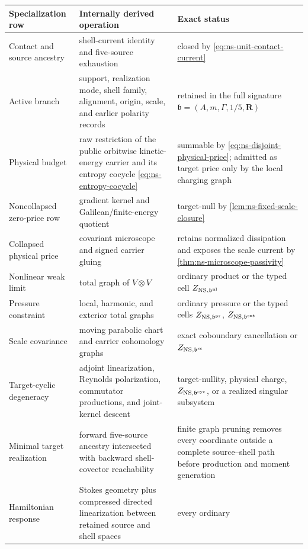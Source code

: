 \documentclass[11pt]{article}
\numberwithin{section}{part}
\theoremstyle{plain}
\theoremstyle{definition}
\theoremstyle{remark}
\begin{document}
\begin{center}
\small
\begin{tabular}{p{.27\linewidth}p{.30\linewidth}p{.34\linewidth}}
\toprule
Specialization row & Internally derived operation & Exact status\\
\midrule
Contact and source ancestry & shell-current identity and five-source
exhaustion & closed by \eqref{eq:ns-unit-contact-current}\\
Active branch & support, realization mode, shell family, alignment, origin,
scale, and earlier polarity records & retained in the full signature
\(\mathfrak b=(A,m,\Gamma,1/5,\mathbf R)\)\\
Physical budget & raw restriction of the public orbitwise kinetic-energy
carrier and its entropy cocycle \eqref{eq:ns-entropy-cocycle} & summable by \eqref{eq:ns-disjoint-physical-price}; admitted as
target price only by the local charging graph\\
Noncollapsed zero-price row & gradient kernel and Galilean/finite-energy
quotient & target-null by \cref{lem:ns-fixed-scale-closure}\\
Collapsed physical price & covariant microscope and signed carrier gluing &
retains normalized dissipation and exposes the scale current by
\cref{thm:ns-microscope-passivity}\\
Nonlinear weak limit & total graph of \(V\otimes V\) & ordinary product or
the typed cell \(Z_{{\rm NS},\mathfrak b^{\rm nl}}\)\\
Pressure constraint & local, harmonic, and exterior total graphs & ordinary
pressure or the typed cells
\(Z_{{\rm NS},\mathfrak b^{\rm pr}}\),
\(Z_{{\rm NS},\mathfrak b^{\rm ext}}\)\\
Scale covariance & moving parabolic chart and carrier cohomology graphs &
exact coboundary cancellation or
\(Z_{{\rm NS},\mathfrak b^{\rm sc}}\)\\
Target-cyclic degeneracy & adjoint linearization, Reynolds polarization,
commutator productions, and joint-kernel descent & target-nullity, physical
charge, \(Z_{{\rm NS},\mathfrak b^{\rm cyc}}\), or a realized singular
subsystem\\
Minimal target realization & forward five-source ancestry intersected with
backward shell-covector reachability & finite graph pruning removes every
coordinate outside a complete source--shell path before production and
moment generation\\
Hamiltonian response & Stokes geometry plus compressed directed
linearization between retained source and shell spaces & every ordinary

\end{tabular}
\end{center}
\end{document}
